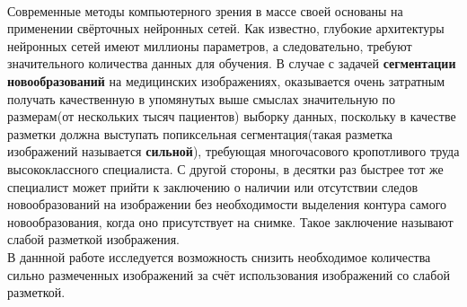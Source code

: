 \\
\indent Современные методы компьютерного зрения в массе своей основаны на применении свёрточных нейронных сетей. Как известно, глубокие архитектуры нейронных сетей имеют миллионы параметров, а следовательно, требуют значительного количества данных для обучения. В случае с задачей {\bf сегментации  новообразований} на медицинских изображениях, оказывается очень затратным получать качественную в упомянутых выше смыслах значительную по размерам(от нескольких тысяч пациентов) выборку данных, поскольку в качестве разметки должна выступать попиксельная сегментация(такая разметка изображений называется {\bf сильной}), требующая многочасового кропотливого труда высококлассного специалиста. С другой стороны, в десятки раз быстрее тот же специалист может прийти к заключению о наличии или отсутствии следов новообразований на изображении без необходимости выделения контура самого новообразования, когда оно присутствует на снимке. Такое заключение называют слабой разметкой изображения. 
\\
\indent В даннной работе исследуется возможность снизить необходимое количества сильно размеченных изображений за счёт использования изображений со слабой разметкой.
